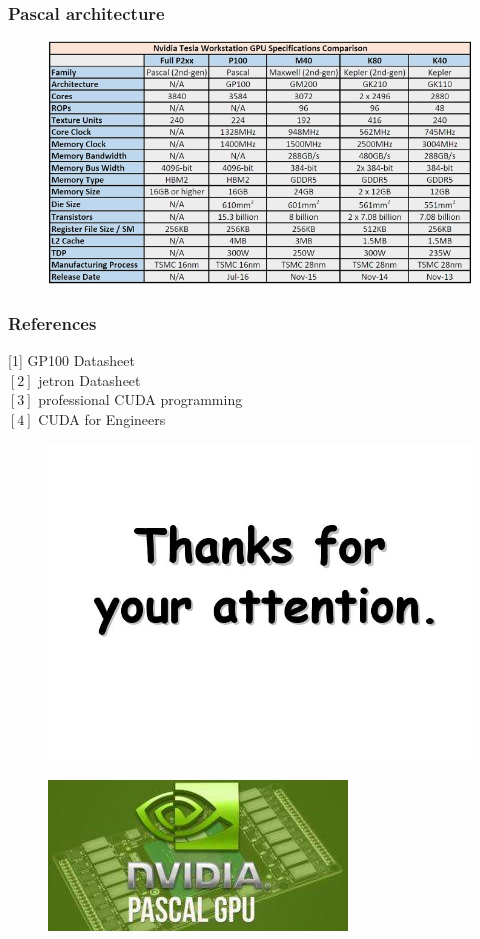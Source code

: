 \documentclass{beamer}
\begin{document}
\begin{frame}
\frametitle{Pascal architecture}
\begin{figure}
	\centering
	\includegraphics[scale=0.8]{pascal9}
\end{figure}

\end{frame}

\begin{frame}

\frametitle{References}
[1] GP100 Datasheet\\
$[2]$ jetron Datasheet\\
$[3]$ professional CUDA programming\\
$[4]$ CUDA for Engineers\\
\end{frame}
\begin{frame}
	
\begin{figure}
	\centering
	\includegraphics[width=0.5\linewidth]{thanks}
\end{figure}

\begin{figure}
	\centering
	\includegraphics[scale=0.6]{pascal5}
\end{figure}
\end{frame}
\end{document}

